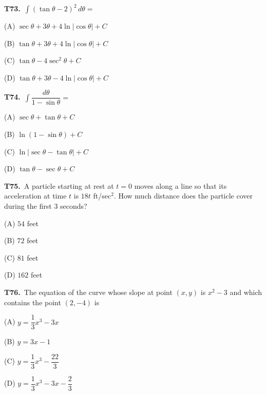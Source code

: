 \documentclass[11pt]{article}
\begin{document}
\bigskip\noindent\textbf{T73.}\ $\displaystyle\int (\tan\theta-2)^2\,d\theta =$
\begin{list}{}{\setlength{\leftmargin}{3em}\setlength{\labelwidth}{2.5em}\setlength{\itemsep}{0pt}\setlength{\topsep}{2pt}}
\item[(A)] $\sec\theta+3\theta+4\ln|\cos\theta|+C$
\item[(B)] $\tan\theta+3\theta+4\ln|\cos\theta|+C$
\item[(C)] $\tan\theta-4\sec^2\theta+C$
\item[(D)] $\tan\theta+3\theta-4\ln|\cos\theta|+C$
\end{list}

\bigskip\noindent\textbf{T74.}\ $\displaystyle\int \dfrac{d\theta}{1-\sin\theta} =$
\begin{list}{}{\setlength{\leftmargin}{3em}\setlength{\labelwidth}{2.5em}\setlength{\itemsep}{0pt}\setlength{\topsep}{2pt}}
\item[(A)] $\sec\theta+\tan\theta+C$
\item[(B)] $\ln(1-\sin\theta)+C$
\item[(C)] $\ln|\sec\theta-\tan\theta|+C$
\item[(D)] $\tan\theta-\sec\theta+C$
\end{list}

\bigskip\noindent\textbf{T75.}\ A particle starting at rest at $t=0$ moves along a line so that its acceleration at time $t$ is $18t$ ft/sec$^2$. How much distance does the particle cover during the first 3 seconds?
\begin{list}{}{\setlength{\leftmargin}{3em}\setlength{\labelwidth}{2.5em}\setlength{\itemsep}{0pt}\setlength{\topsep}{2pt}}
\item[(A)] $54$ feet
\item[(B)] $72$ feet
\item[(C)] $81$ feet
\item[(D)] $162$ feet
\end{list}

\bigskip\noindent\textbf{T76.}\ The equation of the curve whose slope at point $(x,y)$ is $x^2-3$ and which contains the point $(2,-4)$ is
\begin{list}{}{\setlength{\leftmargin}{3em}\setlength{\labelwidth}{2.5em}\setlength{\itemsep}{0pt}\setlength{\topsep}{2pt}}
\item[(A)] $y=\dfrac{1}{3}x^3-3x$
\item[(B)] $y=3x-1$
\item[(C)] $y=\dfrac{1}{3}x^3-\dfrac{22}{3}$
\item[(D)] $y=\dfrac{1}{3}x^3-3x-\dfrac{2}{3}$
\end{list}
\end{document}
